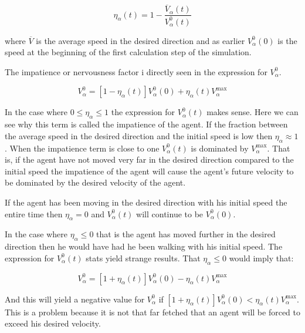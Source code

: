 \begin{equation}
	\eta_{\alpha} \left( t \right) =
    1 - \frac{\overline{V}_{\alpha} \left( t \right)}
             {V_{\alpha}^{0} \left( t \right)}
\end{equation}

where $\overline{V}$ is the average speed in the desired direction and as 
earlier $V_{\alpha}^{0} \left( 0 \right)$ is the speed at the beginning of the 
first calculation step of the simulation.

The impatience or nervousness factor i directly seen in the expression for 
$V_{\alpha}^{0}$.

\begin{equation}
    V_{\alpha}^{0} = \left[ 1 - \eta_{\alpha} \left( t \right) \right] 
    V_{\alpha}^{0} \left( 0 \right) +
    \eta_{\alpha} \left( t \right)V_{\alpha}^{\text{max}}
\end{equation}

In the case where $0 \leq \eta_{\alpha} \leq 1$ the expression for 
$V_{\alpha}^{0} \left( t \right)$  makes sense. Here we can see why this term 
is called the impatience of the agent. If the fraction  between the average 
speed in the desired direction and the initial speed is low then $\eta_{\alpha} \approx 1$. 
When the impatience term is close to one $V_{\alpha}^{0} \left( t \right)$ 
is dominated by $V_{\alpha}^{\text{max}}$. That is, if the agent have not 
moved very far in the desired direction compared to the initial speed the 
impatience of the agent will cause the agent's future velocity to be dominated by 
the desired velocity of the agent.

If the agent has been moving in the desired direction with his initial 
speed the entire time then $\eta_{\alpha} = 0$  and 
$V_{\alpha}^{0} \left( t \right)$ will continue to be $V_{\alpha}^{0} \left( 0 \right)$.

In the case where $\eta_{\alpha} \leq 0$ that is the agent has moved further 
in the desired direction then he would have had he been walking with his 
initial speed. The expression for $V_{\alpha}^{0} \left( t \right)$
stats yield strange results. That $\eta_{\alpha} \leq 0$ would imply that:

\begin{equation}
    V_{\alpha}^{0} = \left[ 1 + \eta_{\alpha} \left( t \right) \right] 
    V_{\alpha}^{0} \left( 0 \right) -
    \eta_{\alpha} \left( t \right)V_{\alpha}^{\text{max}}
\end{equation}

And this will yield a negative value for $V_{\alpha}^{0}$ if $\left[ 1 + \eta_{\alpha} \left( t \right) \right] 
V_{\alpha}^{0} \left( 0 \right) < \eta_{\alpha} \left( t \right)V_{\alpha}^{\text{max}}$. 
This is a problem because it is not that far fetched that an agent will be 
forced to exceed his desired velocity.

